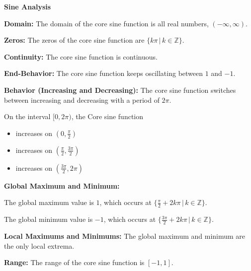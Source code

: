 \documentclass{ximera}
\begin{document}
\begin{summary} \textbf{\textcolor{red!70!yellow}{Sine Analysis}}


\textbf{Domain:} The domain of the core sine function is all real numbers, $(-\infty, \infty)$. 

\textbf{Zeros:} The zeros of the core sine function are $\{ k\pi \, | \, k \in \mathbb{Z} \}$.

\textbf{Continuity:} The core sine function is continuous.

\textbf{End-Behavior:} The core sine function keeps oscillating between $1$ and $-1$.



\textbf{Behavior (Increasing and Decreasing):} The core sine function switches between increasing and decreasing with a period of $2\pi$.

On the interval $[0 , 2\pi)$, the Core sine function

\begin{itemize}
\item increases on $\left(0, \frac{\pi}{2} \right)$
\item increases on $\left(\frac{\pi}{2},  \frac{3\pi}{2}\right)$
\item increases on $\left(\frac{3\pi}{2}, 2\pi \right)$
\end{itemize}








\textbf{Global Maximum and Minimum:} 

The global maximum value is $1$, which occurs at $\{ \frac{\pi}{2} + 2k\pi \, | \, k \in \mathbb{Z} \}$.


The global minimum value is $-1$, which occurs at $\{ \frac{3\pi}{2} + 2k\pi \, | \, k \in \mathbb{Z} \}$.




\textbf{Local Maximums and Minimums:}  The global maximum and minimum are the only local extrema.




\textbf{Range:} The range of the core sine function is $[-1, 1]$.


\end{summary}
\end{document}
